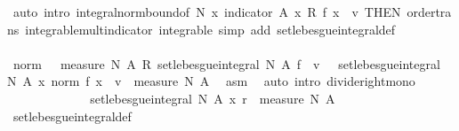 \begin{isabellebody}
\ {\isacharparenleft}{\kern0pt}auto\ intro{\isacharbang}{\kern0pt}{\isacharcolon}{\kern0pt}\ integral{\isacharunderscore}{\kern0pt}norm{\isacharunderscore}{\kern0pt}bound{\isacharbrackleft}{\kern0pt}of\ N\ {\isachardoublequoteopen}{\isasymlambda}x{\isachardot}{\kern0pt}\ indicator\ A\ x\ {\isacharasterisk}{\kern0pt}\isactrlsub R\ {\isacharparenleft}{\kern0pt}f\ x\ {\isacharminus}{\kern0pt}\ v{\isacharparenright}{\kern0pt}{\isachardoublequoteclose}{\isacharcomma}{\kern0pt}\ THEN\ order{\isacharunderscore}{\kern0pt}trans{\isacharbrackright}{\kern0pt}\ integrable{\isacharunderscore}{\kern0pt}mult{\isacharunderscore}{\kern0pt}indicator\ integrable\ simp\ add{\isacharcolon}{\kern0pt}\ set{\isacharunderscore}{\kern0pt}lebesgue{\isacharunderscore}{\kern0pt}integral{\isacharunderscore}{\kern0pt}def{\isacharparenright}{\kern0pt}\isanewline
\ \ \ \ \ \ \ \ \isamarkupfalse%
\ \isamarkupfalse%
\ {\isachardoublequoteopen}norm\ {\isacharparenleft}{\kern0pt}{\isacharparenleft}{\kern0pt}{}\ {\isacharslash}{\kern0pt}\ measure\ N\ A{\isacharparenright}{\kern0pt}\ {\isacharasterisk}{\kern0pt}\isactrlsub R\ set{\isacharunderscore}{\kern0pt}lebesgue{\isacharunderscore}{\kern0pt}integral\ N\ A\ f\ {\isacharminus}{\kern0pt}\ v{\isacharparenright}{\kern0pt}\ {\isasymle}\ \ set{\isacharunderscore}{\kern0pt}lebesgue{\isacharunderscore}{\kern0pt}integral\ N\ A\ {\isacharparenleft}{\kern0pt}{\isasymlambda}x{\isachardot}{\kern0pt}\ norm\ {\isacharparenleft}{\kern0pt}f\ x\ {\isacharminus}{\kern0pt}\ v{\isacharparenright}{\kern0pt}{\isacharparenright}{\kern0pt}\ {\isacharslash}{\kern0pt}\ measure\ N\ A{\isachardoublequoteclose}\ \isamarkupfalse%
\ asm\ \isamarkupfalse%
\ {\isacharparenleft}{\kern0pt}auto\ intro{\isacharcolon}{\kern0pt}\ divide{\isacharunderscore}{\kern0pt}right{\isacharunderscore}{\kern0pt}mono{\isacharparenright}{\kern0pt}\isanewline
\ \ \ \ \ \ \ \ \isamarkupfalse%
\ \isamarkupfalse%
\ {\isachardoublequoteopen}{\isachardot}{\kern0pt}{\isachardot}{\kern0pt}{\isachardot}{\kern0pt}\ {\isacharless}{\kern0pt}\ set{\isacharunderscore}{\kern0pt}lebesgue{\isacharunderscore}{\kern0pt}integral\ N\ A\ {\isacharparenleft}{\kern0pt}{\isasymlambda}x{\isachardot}{\kern0pt}\ r{\isacharparenright}{\kern0pt}\ {\isacharslash}{\kern0pt}\ measure\ N\ A{\isachardoublequoteclose}\ \isanewline
\ \ \ \ \ \ \ \ \ \ \isamarkupfalse%
\ set{\isacharunderscore}{\kern0pt}lebesgue{\isacharunderscore}{\kern0pt}integral{\isacharunderscore}{\kern0pt}def\ \isanewline

\end{isabellebody}

